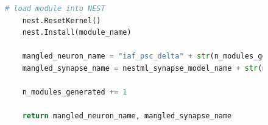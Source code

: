 \begin{figure}[ht!]
\begin{lstlisting}[language=Python, label=lst:generating_code, caption={The code-generation phase}]
    # load module into NEST
    nest.ResetKernel()
    nest.Install(module_name)

    mangled_neuron_name = "iaf_psc_delta" + str(n_modules_generated) + "_nestml__with_" + nestml_synapse_model_name + str(n_modules_generated) + "_nestml"
    mangled_synapse_name = nestml_synapse_model_name + str(n_modules_generated) + "_nestml__with_iaf_psc_delta" + str(n_modules_generated) + "_nestml"

    n_modules_generated += 1

    return mangled_neuron_name, mangled_synapse_name
\end{lstlisting}

\end{figure}

\clearpage


